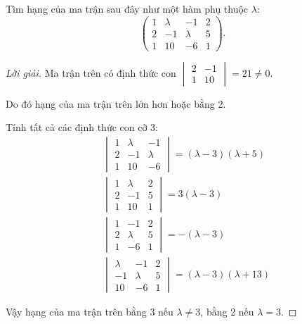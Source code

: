 \documentclass[class=nhvh-linear-algebra,crop=false]{standalone}
\begin{document}
\begin{exercise}
    \par Tìm hạng của ma trận sau đây như một hàm phụ thuộc $\lambda$:
    \[
        \begin{pmatrix}
            1 & \lambda & -1      & 2 \\
            2 & -1      & \lambda & 5 \\
            1 & 10      & -6      & 1
        \end{pmatrix}.
    \]
\end{exercise}

\begin{proof}[Lời giải]
    \par Ma trận trên có định thức con $\begin{vmatrix}2 & -1 \\ 1 & 10\end{vmatrix} = 21 \ne 0$.
    \par Do đó hạng của ma trận trên lớn hơn hoặc bằng 2.
    \par Tính tất cả các định thức con cỡ 3:
    \begin{align*}
         & \begin{vmatrix}
               1 & \lambda & -1      \\
               2 & -1      & \lambda \\
               1 & 10      & -6
           \end{vmatrix} = (\lambda - 3)(\lambda + 5)  \\
         & \begin{vmatrix}
               1 & \lambda & 2 \\
               2 & -1      & 5 \\
               1 & 10      & 1
           \end{vmatrix} = 3(\lambda - 3)              \\
         & \begin{vmatrix}
               1 & -1      & 2 \\
               2 & \lambda & 5 \\
               1 & -6      & 1
           \end{vmatrix} = -(\lambda - 3)              \\
         & \begin{vmatrix}
               \lambda & -1      & 2 \\
               -1      & \lambda & 5 \\
               10      & -6      & 1
           \end{vmatrix} = (\lambda - 3)(\lambda + 13)
    \end{align*}
    \par Vậy hạng của ma trận trên bằng 3 nếu $\lambda \ne 3$, bằng 2 nếu $\lambda = 3$.
\end{proof}
\end{document}
